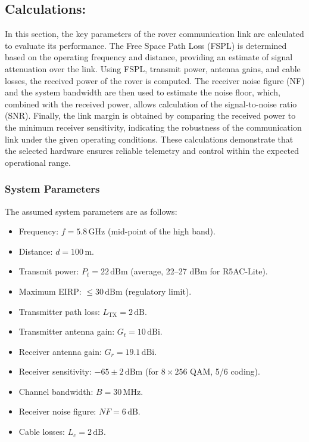 \documentclass[letterpaper, 10 pt, conference]{ieeeconf}  %
\begin{document}
\subsection{Calculations:}
In this section, the key parameters of the rover communication link are calculated to evaluate its performance. The Free Space Path Loss (FSPL) is determined based on the operating frequency and distance, providing an estimate of signal attenuation over the link. Using FSPL, transmit power, antenna gains, and cable losses, the received power of the rover is computed. The receiver noise figure (NF) and the system bandwidth are then used to estimate the noise floor, which, combined with the received power, allows calculation of the signal-to-noise ratio (SNR). Finally, the link margin is obtained by comparing the received power to the minimum receiver sensitivity, indicating the robustness of the communication link under the given operating conditions. These calculations demonstrate that the selected hardware ensures reliable telemetry and control within the expected operational range.

\subsubsection*{System Parameters}

The assumed system parameters are as follows:

\begin{itemize}
    \item Frequency: $f = 5.8 \,\text{GHz}$ (mid-point of the high band).
    \item Distance: $d = 100 \,\text{m}$.
    \item Transmit power: $P_t = 22 \,\text{dBm}$ (average, 22–27 dBm for R5AC-Lite).
    \item Maximum EIRP: $\leq 30 \,\text{dBm}$ (regulatory limit).
    \item Transmitter path loss: $L_{\text{TX}} = 2 \,\text{dB}$.
    \item Transmitter antenna gain: $G_t = 10 \,\text{dBi}$.
    \item Receiver antenna gain: $G_r = 19.1 \,\text{dBi}$.
    \item Receiver sensitivity: $-65 \pm 2 \,\text{dBm}$ (for $8 \times 256$ QAM, 5/6 coding).
    \item Channel bandwidth: $B = 30 \,\text{MHz}$.
    \item Receiver noise figure: $NF = 6 \,\text{dB}$.
    \item Cable losses: $L_c = 2 \,\text{dB}$.
\end{itemize}
\end{document}
